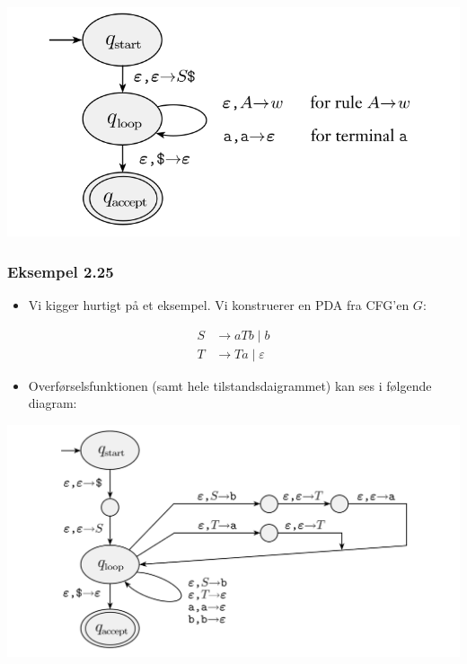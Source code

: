 \begin{frame}[allowframebreaks]
\begin{itemize}
		      \includegraphics[scale=0.3]{figur/figur224.png}
	\end{itemize}
\end{frame}

\begin{frame}[allowframebreaks]
	\frametitle{Eksempel 2.25}

	\begin{itemize}
		\item Vi kigger hurtigt på et eksempel. Vi konstruerer en PDA fra CFG'en $G$:
	\end{itemize}
	\begin{align*}
		S & \rightarrow aTb \mid b          \\
		T & \rightarrow Ta \mid \varepsilon
	\end{align*}

	\begin{itemize}
		\item Overførselsfunktionen (samt hele tilstandsdaigrammet) kan ses i følgende diagram:
	\end{itemize}
	\includegraphics[scale=0.3]{figur/figur226.png}
\end{frame}

